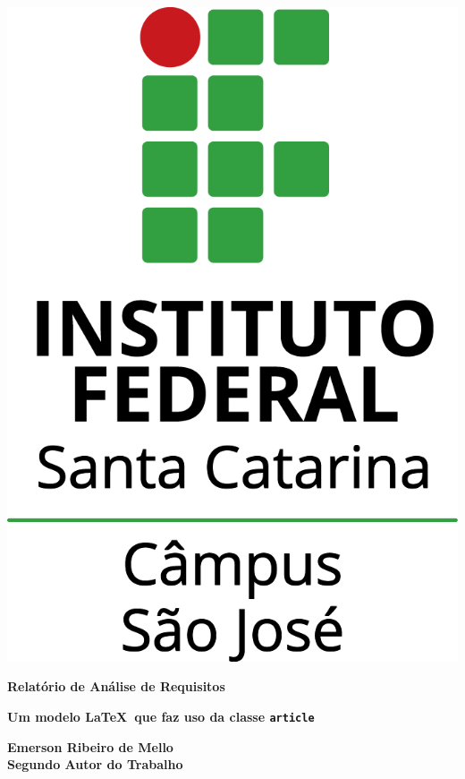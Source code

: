 \documentclass[11pt]{../../classes/ifscarticle}
\begin{document}
\begin{center}

\includegraphics[scale=.7]{../../classes/imagens/ifsc-v}
\vspace{7.5cm}

{\huge \bfseries Relatório de Análise de Requisitos}

\vspace{.5cm}

{\large \bfseries Um modelo \LaTeX~que faz uso da classe \texttt{article}}

\vfill
\end{center}

{\noindent \large \bfseries 
Emerson Ribeiro de Mello%
\\[.5em] Segundo Autor do Trabalho%
}
\end{document}
